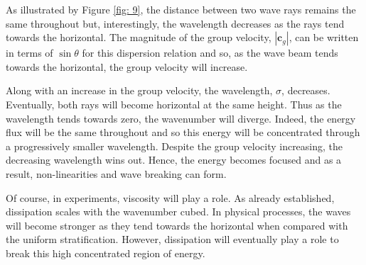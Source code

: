 \documentclass[a4paper]{article}
\numberwithin{equation}{section}
\begin{document}
As illustrated by Figure \ref{fig: 9}, the distance between two wave rays remains the same throughout but, interestingly, the wavelength decreases as the rays tend towards the horizontal. The magnitude of the group velocity, $|\mathbf{c}_g|$, can be written in terms of $\sin\theta$ for this dispersion relation and so, as the wave beam tends towards the horizontal, the group velocity will increase.

Along with an increase in the group velocity, the wavelength, $\sigma$, decreases. Eventually, both rays will become horizontal at the same height. Thus as the wavelength tends towards zero, the wavenumber will diverge. Indeed, the energy flux will be the same throughout and so this energy will be concentrated through a progressively smaller wavelength. Despite the group velocity increasing, the decreasing wavelength wins out. Hence, the energy becomes focused and as a result, non-linearities and wave breaking can form. 

Of course, in experiments, viscosity will play a role. As already established, dissipation scales with the wavenumber cubed. In physical processes, the waves will become stronger as they tend towards the horizontal when compared with the uniform stratification. However, dissipation will eventually play a role to break this high concentrated region of energy.
\end{document}
